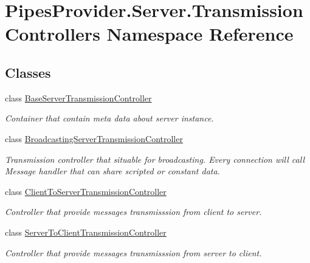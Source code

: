 \hypertarget{namespace_pipes_provider_1_1_server_1_1_transmission_controllers}{}\section{Pipes\+Provider.\+Server.\+Transmission\+Controllers Namespace Reference}
\label{namespace_pipes_provider_1_1_server_1_1_transmission_controllers}
\subsection*{Classes}
\begin{DoxyCompactItemize}
\item 
class \mbox{\hyperlink{class_pipes_provider_1_1_server_1_1_transmission_controllers_1_1_base_server_transmission_controller}{Base\+Server\+Transmission\+Controller}}
\begin{DoxyCompactList}\small\item\em Container that contain meta data about server instance. \end{DoxyCompactList}\item 
class \mbox{\hyperlink{class_pipes_provider_1_1_server_1_1_transmission_controllers_1_1_broadcasting_server_transmission_controller}{Broadcasting\+Server\+Transmission\+Controller}}
\begin{DoxyCompactList}\small\item\em Transmission controller that situable for broadcasting. Every connection will call Message handler that can share scripted or constant data. \end{DoxyCompactList}\item 
class \mbox{\hyperlink{class_pipes_provider_1_1_server_1_1_transmission_controllers_1_1_client_to_server_transmission_controller}{Client\+To\+Server\+Transmission\+Controller}}
\begin{DoxyCompactList}\small\item\em Controller that provide message\textquotesingle{}s transmisssion from client to server. \end{DoxyCompactList}\item 
class \mbox{\hyperlink{class_pipes_provider_1_1_server_1_1_transmission_controllers_1_1_server_to_client_transmission_controller}{Server\+To\+Client\+Transmission\+Controller}}
\begin{DoxyCompactList}\small\item\em Controller that provide message\textquotesingle{}s transmisssion from server to client. \end{DoxyCompactList}\end{DoxyCompactItemize}
